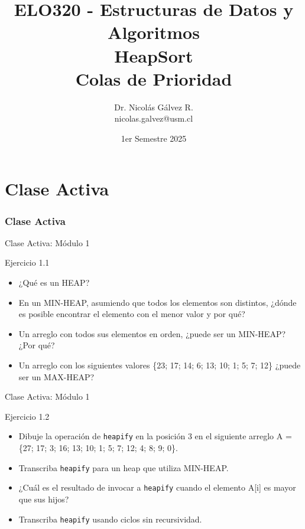 \documentclass{beamer}
\title{ELO320 - Estructuras de Datos y Algoritmos\\HeapSort\\\small{Colas de Prioridad}}
\author{Dr. Nicolás Gálvez R.\\{\small nicolas.galvez@usm.cl}}
\institute{Ing. Civil Telemática - Departamento de Electrónica}
\date{1er Semestre 2025}
\begin{document}
\frame{\titlepage}

%
%
\part{Clase Activa}
\section{Clase Activa}
\begin{frame}[fragile]{Clase Activa: Módulo 1}
\begin{exampleblock}{Ejercicio 1.1}
\begin{itemize}
\item ¿Qué es un HEAP?
\item En un MIN-HEAP, asumiendo que todos los elementos son distintos, ¿dónde es posible encontrar el elemento con el menor valor y por qué?
\item Un arreglo con todos sus elementos en orden, ¿puede ser un MIN-HEAP? ¿Por qué? 
\item Un arreglo con los siguientes valores \{23; 17; 14; 6; 13; 10; 1; 5; 7; 12\} ¿puede ser un MAX-HEAP?
\end{itemize}
\end{exampleblock}
\end{frame}


\begin{frame}[fragile]{Clase Activa: Módulo 1}
\begin{exampleblock}{Ejercicio 1.2}
\begin{itemize}
\item Dibuje la operación de \texttt{heapify} en la posición 3 en el siguiente arreglo A = \{27; 17; 3; 16; 13; 10; 1; 5; 7; 12; 4; 8; 9; 0\}.
\item Transcriba \texttt{heapify} para un heap que utiliza MIN-HEAP.
\item ¿Cuál es el resultado de invocar a \texttt{heapify} cuando el elemento A[i] es mayor que sus hijos?
\item Transcriba \texttt{heapify} usando ciclos sin recursividad.
\end{itemize}
\end{exampleblock}
\end{frame}
\end{document}
